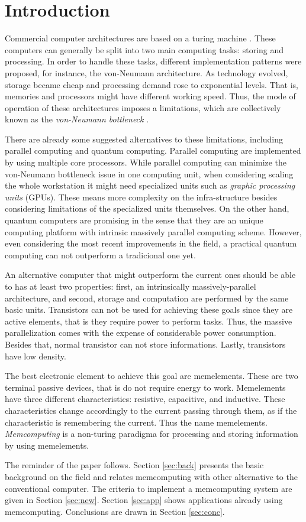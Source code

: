 \section{Introduction}
\label{sec:intro}

Commercial computer architectures are based on a turing machine \citep{turing48}.
These computers can generally be split into two main computing tasks: storing and processing.
In order to handle these tasks, different implementation patterns were proposed, for instance, the von-Neumann architecture.
As technology evolved, storage became cheap and processing demand rose to exponential levels.
That is, memories and processors might have different working speed.
Thus, the mode of operation of these architectures imposes a limitations, which are collectively known as the \emph{von-Neumann bottleneck} \citep{Backus:1978:PLV:359576.359579}. 

There are already some suggested alternatives to these limitations, including parallel computing and quantum computing.
Parallel computing are implemented by using multiple core processors.
While parallel computing can minimize the von-Neumann bottleneck issue in one computing unit, when considering scaling the whole workstation it might need specialized units such as \emph{graphic processing units} (GPUs).
These means more complexity on the infra-structure besides considering limitations of the specialized units themselves.
On the other hand, quantum computers are promising in the sense that they are an unique computing platform with intrinsic massively parallel computing scheme.
However, even considering the most recent improvements in the field, a practical quantum computing can not outperform a tradicional one yet.

An alternative computer that might outperform the current ones should be able to has at least two properties: first, an intrinsically massively-parallel architecture, and second, storage and computation are performed by the same basic units.
Transistors can not be used for achieving these goals since they are active elements, that is they require power to perform tasks.
Thus, the massive parallelization comes with the expense of considerable power consumption.
Besides that, normal transistor can not store informations.
Lastly, transistors have low density.

The best electronic element to achieve this goal are memelements.
These are two terminal passive devices, that is do not require energy to work.
Memelements have three different characteristics: resistive, capacitive, and inductive.
These characteristics change accordingly to the current passing through them, as if the characteristic is remembering the current.
Thus the name memelements.
\emph{Memcomputing} \citep{DiVentra:2012fh} is a non-turing paradigma for processing and storing information by using memelements.

The reminder of the paper follows.
Section \ref{sec:back} presents the basic background on the field and relates memcomputing with other alternative to the conventional computer.
The criteria to implement a memcomputing system are given in Section \ref{sec:new}.
Section \ref{sec:app} shows applications already using memcomputing.
Conclusions are drawn in Section \ref{sec:conc}.